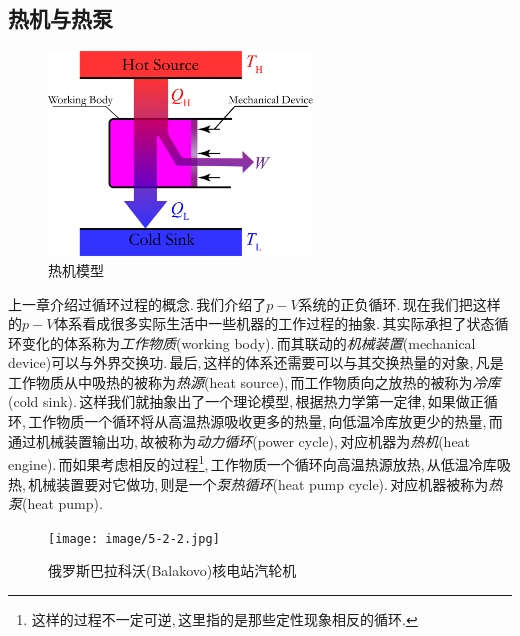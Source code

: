 \subsection{热机与热泵}
\begin{figure}
\centering
\includegraphics[width=7cm]{image/5-2-1.png}
\caption{热机模型}\label{fig:heat engine}
\end{figure}
上一章介绍过循环过程的概念.\,我们介绍了$p-V$系统的正负循环.\,现在我们把这样的$p-V$体系看成很多实际生活中一些机器的工作过程的抽象.\,其实际承担了状态循环变化的体系称为\emph{工作物质}(working body).\,而其联动的\emph{机械装置}(mechanical device)可以与外界交换功.\,最后,\,这样的体系还需要可以与其交换热量的对象,\,凡是工作物质从中吸热的被称为\emph{热源}(heat source),\,而工作物质向之放热的被称为\emph{冷库}(cold sink).\,这样我们就抽象出了一个理论模型,\,根据热力学第一定律,\,如果做正循环,\,工作物质一个循环将从高温热源吸收更多的热量,\,向低温冷库放更少的热量,\,而通过机械装置输出功,\,故被称为\emph{动力循环}(power cycle),\,对应机器为\emph{热机}(heat engine).\,而如果考虑相反的过程\footnote{这样的过程不一定可逆,\,这里指的是那些定性现象相反的循环.},\,工作物质一个循环向高温热源放热,\,从低温冷库吸热,\,机械装置要对它做功,\,则是一个\emph{泵热循环}(heat pump cycle).\,对应机器被称为\emph{热泵}(heat pump).

\begin{figure}[H]
\centering
\texttt{[image: image/5-2-2.jpg]}
\caption{俄罗斯巴拉科沃(Balakovo)核电站汽轮机}
\end{figure}

